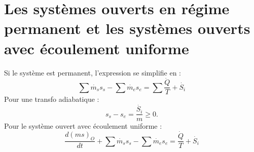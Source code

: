 	\section{Les systèmes ouverts en régime permanent et les systèmes ouverts avec
			 écoulement uniforme}
	Si le système est permanent, l'expression se simplifie en : 
	\begin{equation}
	\sum \dot{m_s}s_s - \sum \dot{m_e}s_e = \sum\dfrac{\dot{Q}}{T}+\dot{S_i}
	\end{equation}
	Pour une transfo adiabatique :
	\begin{equation}
	s_s-s_e = \dfrac{\dot{S_i}}{m}\geq 0.
	\end{equation}
	Pour le système ouvert avec écoulement uniforme :
	\begin{equation}
	\dfrac{d(ms)_O}{dt} + \sum \dot{m_s}s_s - \sum \dot{m_e}s_e = \dfrac{\dot{Q}}{T} 
	+\dot{S_i}
	\end{equation}
	
	
